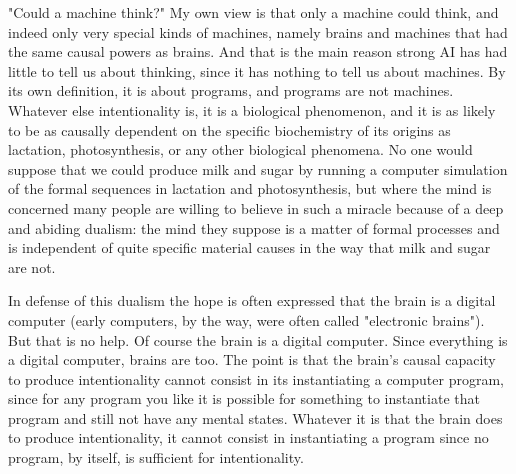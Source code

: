"Could a machine think?" My own view is that only a machine could think, and indeed only very special kinds
of machines, namely brains and machines that had the same causal powers as brains. And that is the main
reason strong AI has had little to tell us about thinking, since it has nothing to tell us about machines. By its own
definition, it is about programs, and programs are not machines. Whatever else intentionality is, it is a biological
phenomenon, and it is as likely to be as causally dependent on the specific biochemistry of its origins as
lactation, photosynthesis, or any other biological phenomena. No one would suppose that we could produce
milk and sugar by running a computer simulation of the formal sequences in lactation and photosynthesis, but
where the mind is concerned many people are willing to believe in such a miracle because of a deep and abiding
dualism: the mind they suppose is a matter of formal processes and is independent of quite specific material
causes in the way that milk and sugar are not.

In defense of this dualism the hope is often expressed that the brain is a digital computer (early computers, by
the way, were often called "electronic brains"). But that is no help. Of course the brain is a digital computer.
Since everything is a digital computer, brains are too. The point is that the brain's causal capacity to produce
intentionality cannot consist in its instantiating a computer program, since for any program you like it is possible
for something to instantiate that program and still not have any mental states. Whatever it is that the brain does
to produce intentionality, it cannot consist in instantiating a program since no program, by itself, is sufficient for
intentionality.